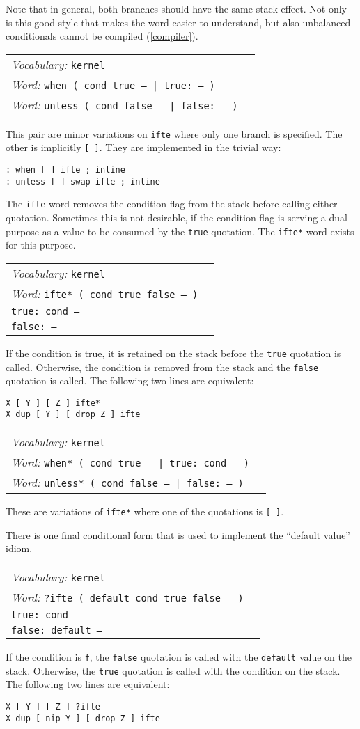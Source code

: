 \documentclass{book}
\newcommand{\vocabulary}[1]{\emph{Vocabulary:} \texttt{#1}&\\}
\newcommand{\ordinaryword}[2]{\index{\texttt{#1}}\emph{Word:} \texttt{#2}&\\}
\newcommand{\wordtable}[1]{

\begin{tabularx}{12cm}[t]{lX}
\hline
#1
\hline
\end{tabularx}

}
\begin{document}
Note that in general, both branches should have the same stack effect. Not only is this good style that makes the word easier to understand, but also unbalanced conditionals cannot be compiled (\ref{compiler}).
\wordtable{
\vocabulary{kernel}
\ordinaryword{when}{when ( cond true -- | true:~-- )}
\ordinaryword{unless}{unless ( cond false -- | false:~-- )}
}
This pair are minor variations on \texttt{ifte} where only one branch is specified. The other is implicitly \texttt{[ ]}. They are implemented in the trivial way:
\begin{verbatim}
: when [ ] ifte ; inline
: unless [ ] swap ifte ; inline
\end{verbatim}
The \texttt{ifte} word removes the condition flag from the stack before calling either quotation. Sometimes this is not desirable, if the condition flag is serving a dual purpose as a value to be consumed by the \texttt{true} quotation. The \texttt{ifte*} word exists for this purpose.
\wordtable{
\vocabulary{kernel}
\ordinaryword{ifte*}{ifte*~( cond true false -- )}
\texttt{true:~cond --}\\
\texttt{false:~--}\\
}
If the condition is true, it is retained on the stack before the \texttt{true} quotation is called. Otherwise, the condition is removed from the stack and the \texttt{false} quotation is called. The following two lines are equivalent:
\begin{verbatim}
X [ Y ] [ Z ] ifte*
X dup [ Y ] [ drop Z ] ifte
\end{verbatim}
\wordtable{
\vocabulary{kernel}
\ordinaryword{when*}{when*~( cond true -- | true:~cond -- )}
\ordinaryword{unless*}{unless*~( cond false -- | false:~-- )}
}
These are variations of \texttt{ifte*} where one of the quotations is \texttt{[ ]}.

There is one final conditional form that is used to implement the ``default value'' idiom.
\wordtable{
\vocabulary{kernel}
\ordinaryword{?ifte}{?ifte ( default cond true false -- )}
\texttt{true:~cond --}\\
\texttt{false:~default --}\\
}
If the condition is \texttt{f}, the \texttt{false} quotation is called with the \texttt{default} value on the stack. Otherwise, the \texttt{true} quotation is called with the condition on the stack. The following two lines are equivalent:
\begin{verbatim}
X [ Y ] [ Z ] ?ifte
X dup [ nip Y ] [ drop Z ] ifte
\end{verbatim}
\end{document}
